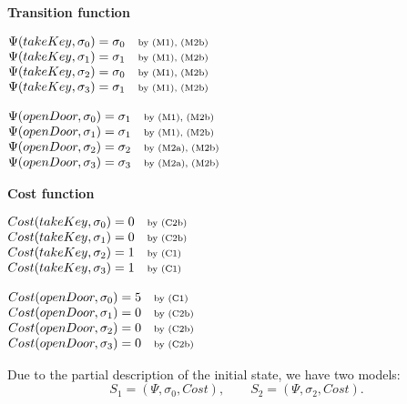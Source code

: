 \documentclass[11pt]{article}
\makeatletter
\newcommand{\exampleblocktitle}[1]{\par\medskip\noindent\textbf{#1}\par\smallskip}
\newcommand{\byrule}[1]{\quad \text{\scriptsize by #1}}
\newenvironment{statementblock}
{\begin{flushleft}\renewcommand{\arraystretch}{1.1}\(\begin{array}{@{}l@{}}}
{\end{array}\)\end{flushleft}}
\makeatother
\begin{document}
\exampleblocktitle{Transition function}
\noindent
\begin{minipage}[t]{0.47\textwidth}
\begin{statementblock}
\Psi(takeKey, \sigma_0) = \sigma_0 \byrule{(M1), (M2b)} \\
\Psi(takeKey, \sigma_1) = \sigma_1 \byrule{(M1), (M2b)} \\
\Psi(takeKey, \sigma_2) = \sigma_0 \byrule{(M1), (M2b)} \\
\Psi(takeKey, \sigma_3) = \sigma_1 \byrule{(M1), (M2b)}
\end{statementblock}
\end{minipage}
\hfill
\begin{minipage}[t]{0.47\textwidth}
\begin{statementblock}
\Psi(openDoor, \sigma_0) = \sigma_1 \byrule{(M1), (M2b)} \\
\Psi(openDoor, \sigma_1) = \sigma_1 \byrule{(M1), (M2b)} \\
\Psi(openDoor, \sigma_2) = \sigma_2 \byrule{(M2a), (M2b)} \\
\Psi(openDoor, \sigma_3) = \sigma_3 \byrule{(M2a), (M2b)}
\end{statementblock}
\end{minipage}

\exampleblocktitle{Cost function}
\noindent
\begin{minipage}[t]{0.47\textwidth}
\begin{statementblock}
Cost(takeKey, \sigma_0) = 0 \byrule{(C2b)} \\
Cost(takeKey, \sigma_1) = 0 \byrule{(C2b)} \\
Cost(takeKey, \sigma_2) = 1 \byrule{(C1)} \\
Cost(takeKey, \sigma_3) = 1 \byrule{(C1)}
\end{statementblock}
\end{minipage}
\hfill
\begin{minipage}[t]{0.47\textwidth}
\begin{statementblock}
Cost(openDoor, \sigma_0) = 5 \byrule{(C1)} \\
Cost(openDoor, \sigma_1) = 0 \byrule{(C2b)} \\
Cost(openDoor, \sigma_2) = 0 \byrule{(C2b)} \\
Cost(openDoor, \sigma_3) = 0 \byrule{(C2b)}
\end{statementblock}
\end{minipage}

Due to the partial description of the initial state, we have two models:
\[
S_1 = (\Psi, \sigma_0, Cost), \qquad S_2 = (\Psi, \sigma_2, Cost).
\]
\end{document}
